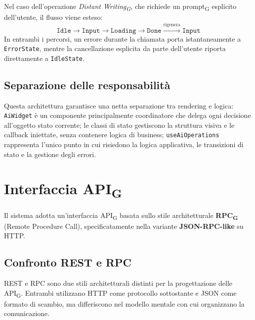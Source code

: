 \documentclass[11pt,a4paper]{article}
\newcommand{\gls}[1]{#1\textsubscript{G}}
\begin{document}
Nel caso dell'operazione \textit{\gls{Distant Writing}}, che richiede un \gls{prompt} esplicito dell'utente, il flusso viene esteso:
\begin{equation*}
\texttt{Idle} \to \texttt{Input} \to \texttt{Loading} \to \texttt{Done} \xrightarrow{\text{rigenera}} \texttt{Input}
\end{equation*}
In entrambi i percorsi, un errore durante la chiamata porta istantaneamente a \texttt{ErrorState}, mentre la cancellazione esplicita da parte dell'utente riporta direttamente a \texttt{IdleState}.

\subsection{Separazione delle responsabilità}
Questa architettura garantisce una netta separazione tra rendering e logica: \texttt{AiWidget} è un componente principalmente coordinatore che delega ogni decisione all’oggetto stato corrente; le classi di stato gestiscono la struttura visiva e le callback iniettate, senza contenere logica di business; \texttt{useAiOperations} rappresenta l’unico punto in cui risiedono la logica applicativa, le transizioni di stato e la gestione degli errori.

\newpage

\section{Interfaccia \gls{API}}
Il sistema adotta un'interfaccia \gls{API} basata sullo stile architetturale
\textbf{\gls{RPC}} (Remote Procedure Call), specificatamente nella variante
\textbf{JSON-RPC-like} su HTTP.

\subsection{Confronto REST e RPC}
REST e RPC sono due stili architetturali distinti per la progettazione
delle \gls{API}. Entrambi utilizzano HTTP come protocollo sottostante
e JSON come formato di scambio, ma differiscono nel modello mentale con cui organizzano la comunicazione.
\end{document}
